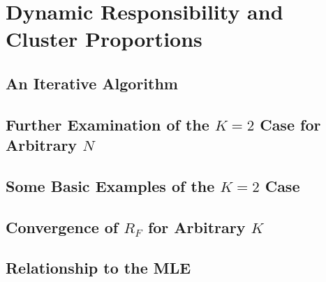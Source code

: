 %
%
\chapter{Dynamic Responsibility and Cluster Proportions}\label{Algorithm}
	\section{An Iterative Algorithm}
	\section{Further Examination of the \(K=2\) Case for Arbitrary \(N\)}
		\FloatBarrier
	\section{Some Basic Examples of the \(K=2\) Case}
		
		\FloatBarrier
	\section{Convergence of \( R_F \) for Arbitrary \(K\)}
		\FloatBarrier
	\section{Relationship to the MLE}
		\FloatBarrier
%
